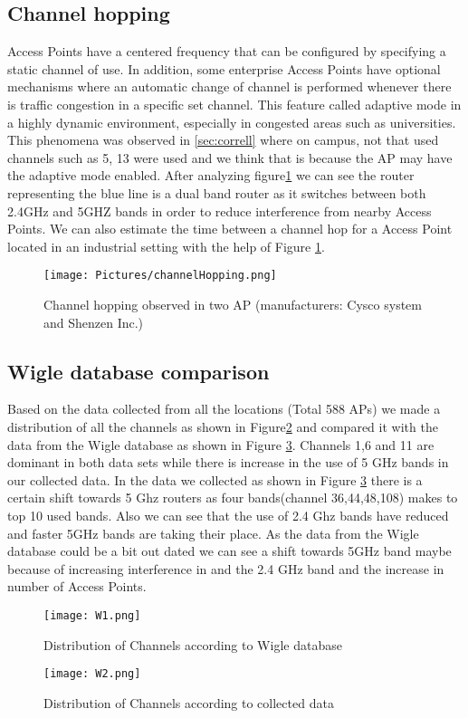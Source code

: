 \documentclass[conference]{IEEEtran}
\begin{document}
\subsection{Channel hopping}
Access Points have a centered frequency that can be configured by specifying a static channel of use. In addition, some enterprise Access Points have optional mechanisms where an automatic change of channel is performed whenever there is traffic congestion in a specific set channel. This feature called adaptive mode in a highly dynamic environment, especially in congested areas such as universities. This phenomena was observed in \ref{sec:correll} where on campus, not that used channels such as 5, 13 were used and we think that is because the AP may have the adaptive mode enabled. After analyzing figure\ref{fig:CH} we can see the router representing the blue line is a dual band router as it switches between both 2.4GHz and 5GHZ bands in order to reduce interference from nearby Access Points. We can also estimate the time between a channel hop for a Access Point located in an industrial setting with the help of Figure \ref{fig:CH}. 
\begin{figure}[ht]
    \centering
    \texttt{[image: Pictures/channelHopping.png]}
    \caption{Channel hopping observed in two AP (manufacturers: Cysco system and Shenzen Inc.)}
    \label{fig:CH}
\end{figure}

\subsection{Wigle database comparison}
Based on the data collected from all the locations (Total 588 APs) we made a distribution of all the channels as shown in Figure\ref{fig:w1}  and compared it with the data from the Wigle database as shown in Figure \ref{fig:w2}. Channels 1,6 and 11 are dominant in both data sets while there is increase in the use of 5 GHz bands in our collected data. In the data we collected as shown in Figure \ref{fig:w2} there is a certain shift towards 5 Ghz routers as four bands(channel 36,44,48,108) makes to top 10 used bands. Also we can see that the use of 2.4 Ghz bands have reduced and faster 5GHz bands are taking their place. As the data from the Wigle database could be a bit out dated we can see a shift towards 5GHz band maybe because of increasing interference in and the 2.4 GHz band and the increase in number of Access Points.

\begin{figure}[ht]
    \centering
    \texttt{[image: W1.png]}
    \caption{Distribution of Channels according to Wigle database}
    \label{fig:w1}
\end{figure}
\begin{figure}[ht]
    \centering
    \texttt{[image: W2.png]}
    \caption{Distribution of Channels according to collected data }
    \label{fig:w2}
\end{figure}
\end{document}
